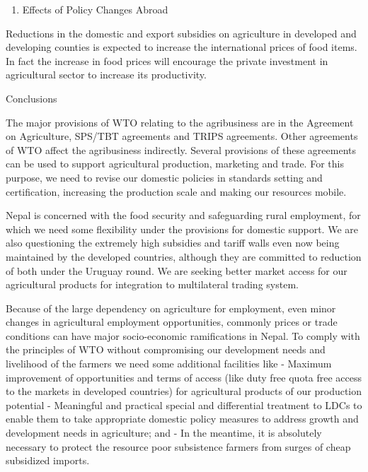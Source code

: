 \documentclass[
  openany]{book}
\providecommand{\tightlist}{%
  \setlength{\itemsep}{0pt}\setlength{\parskip}{0pt}}
\begin{document}
\begin{enumerate}
\def\labelenumi{\arabic{enumi}.}
\setcounter{enumi}{7}
\tightlist
\item
  Effects of Policy Changes Abroad
\end{enumerate}

Reductions in the domestic and export subsidies on agriculture in developed and developing counties is expected to increase the international prices of food items. In fact the increase in food prices will encourage the private investment in agricultural sector to increase its productivity.

Conclusions

The major provisions of WTO relating to the agribusiness are in the Agreement on Agriculture, SPS/TBT agreements and TRIPS agreements. Other agreements of WTO affect the agribusiness indirectly. Several provisions of these agreements can be used to support agricultural production, marketing and trade. For this purpose, we need to revise our domestic policies in standards setting and certification, increasing the production scale and making our resources mobile.

Nepal is concerned with the food security and safeguarding rural employment, for which we need some flexibility under the provisions for domestic support. We are also questioning the extremely high subsidies and tariff walls even now being maintained by the developed countries, although they are committed to reduction of both under the Uruguay round. We are seeking better market access for our agricultural products for integration to multilateral trading system.

Because of the large dependency on agriculture for employment, even minor changes in agricultural employment opportunities, commonly prices or trade conditions can have major socio-economic ramifications in Nepal. To comply with the principles of WTO without compromising our development needs and livelihood of the farmers we need some additional facilities like
- Maximum improvement of opportunities and terms of access (like duty free quota free access to the markets in developed countries) for agricultural products of our production potential
- Meaningful and practical special and differential treatment to LDCs to enable them to take appropriate domestic policy measures to address growth and development needs in agriculture; and
- In the meantime, it is absolutely necessary to protect the resource poor subsistence farmers from surges of cheap subsidized imports.
\end{document}
